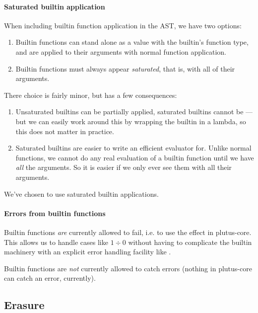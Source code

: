 \paragraph{Saturated builtin application}

When including builtin function application in the AST, we have two options:
\begin{enumerate}
\item
  Builtin functions can stand alone as a value with the builtin's function type, and are applied to their arguments with normal function application.
\item
  Builtin functions must always appear \emph{saturated}, that is, with all of their arguments.
\end{enumerate}

There choice is fairly minor, but has a few consequences:
\begin{enumerate}
\item
  Unsaturated builtins can be partially applied, saturated builtins cannot be --- but we can easily work around this by wrapping the builtin in a lambda, so this does not matter in practice.
\item
  Saturated builtins are easier to write an efficient evaluator for.
  Unlike normal functions, we cannot do any real evaluation of a builtin function until we have \emph{all} the arguments.
  So it is easier if we only ever see them with all their arguments.
\end{enumerate}

We've chosen to use saturated builtin applications.

\paragraph{Errors from builtin functions}

Builtin functions \emph{are} currently allowed to fail, i.e. to use the  effect in \gls{plutus-core}.
This allows us to handle cases like $1 \div 0$ without having to complicate the builtin machinery with an explicit error handling facility like .

Builtin functions are \emph{not} currently allowed to catch errors (nothing in \gls{plutus-core} can catch an error, currently).

\subsection{Erasure}
\label{sec:erasure}


